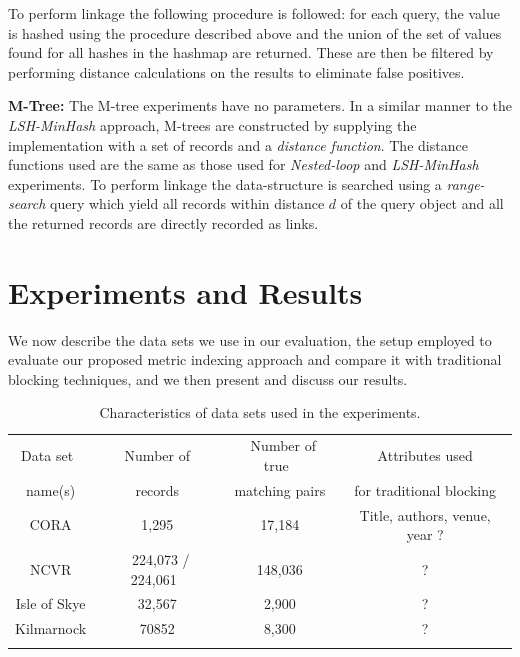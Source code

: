 \documentclass{llncs}
\begin{document}
To perform linkage the following procedure is followed: for each query, the value is hashed using the procedure described above and the union of the set of values found for all hashes in the hashmap are returned. These are then be filtered by performing distance calculations on the results to eliminate false positives.

\smallskip 
\textbf{M-Tree:} The M-tree experiments have no parameters. In a similar manner to the \emph{LSH-MinHash} approach, M-trees are constructed by supplying the implementation with a set of records and a \emph{distance function}. The distance functions used are the same as those used for \emph{Nested-loop} and \emph{LSH-MinHash} experiments. To perform linkage the data-structure is searched using a \emph{range-search} query which yield all records within distance $d$ of the query object and all the returned records are directly recorded as links.


\section{Experiments and Results}
\label{sec-exp}

We now describe the data sets we use in our evaluation, the setup
employed to evaluate our proposed metric indexing approach and
compare it with traditional blocking techniques, and we then present
and discuss our results.



\begin{table}[t]
\caption{Characteristics of data sets used in the experiments.}
 \label{table-datasets}
  \centering
  \begin{scriptsize}
  \begin{tabular}{cccc}
  \hline\noalign{\smallskip}
  Data set~ & ~Number of~ & ~Number of true~ & Attributes used \\
  name(s)  & records  & matching pairs & for traditional blocking \\
  \noalign{\smallskip} \hline \noalign{\smallskip}
  CORA  & 1,295 & 17,184 & Title, authors, venue, year ? \\
  NCVR  & ~224,073 / 224,061~ & ~148,036~ & ? \\
  Isle of Skye & 32,567 & 2,900 & ? \\
  Kilmarnock  & 70852 & 8,300 & ? \\
  \noalign{\smallskip} \hline
  \end{tabular}
  \end{scriptsize}
\end{table}
\end{document}
